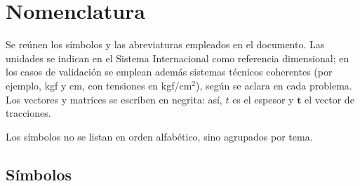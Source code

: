 
\chapter*{Nomenclatura}
\begingroup
\pagestyle{nomenclatura}

Se reúnen los símbolos y las abreviaturas empleados en el documento. Las
unidades se indican en el Sistema Internacional como referencia dimensional;
en los casos de validación se emplean además sistemas técnicos coherentes
(por ejemplo, kgf y cm, con tensiones en kgf/cm$^2$), según se aclara en cada problema.
Los vectores y matrices se escriben en negrita: así, $t$ es el espesor y $\bm{t}$ el
vector de tracciones.

Los símbolos no se listan en orden alfabético, sino agrupados por tema.

\section*{Símbolos}

